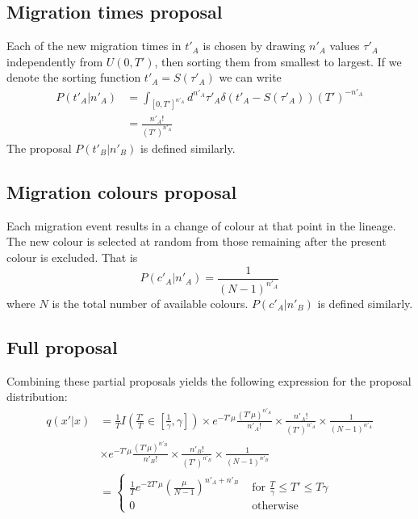 \documentclass[a4paper, 11pt]{article}
\begin{document}
\subsection{Migration times proposal}

Each of the new migration times in $t'_A$ is chosen by drawing $n'_A$
values $\tau'_A$ independently from $U(0,T')$, then sorting them from smallest
to largest.  If we denote the sorting function $t'_A=S(\tau'_A)$ we
can write
\begin{align}
  P(t'_A|n'_A) &= \int_{[0,T']^{n'_A}}
  d^{n'_A}\tau'_A\delta(t'_A-S(\tau'_A))(T')^{-n'_A}\nonumber\\
&= \frac{n'_A!}{(T')^{n'_A}}
\end{align}
The proposal $P(t'_B|n'_B)$ is defined similarly.

\subsection{Migration colours proposal}

Each migration event results in a change of colour at that point in
the lineage. The new colour is selected at random from those remaining
after the present colour is excluded. That is
\begin{equation}
  P(c'_A|n'_A) = \frac{1}{(N-1)^{n'_A}}
\end{equation}
where $N$ is the total number of available colours. $P(c'_A|n'_B)$ is
defined similarly.

\subsection{Full proposal}

Combining these partial proposals yields the following expression for
the proposal distribution:
\begin{align}
  q(x'|x)&=
  \frac{1}{T}I(\frac{T'}{T}\in[\frac{1}{\gamma},\gamma])\times
  e^{-T'\mu}\frac{(T'\mu)^{n'_A}}{n'_A!}\times
  \frac{n'_A!}{(T')^{n'_A}}\times \frac{1}{(N-1)^{n'_A}}\nonumber\\
&\times e^{-T'\mu}\frac{(T'\mu)^{n'_B}}{n'_B!}\times
  \frac{n'_B!}{(T')^{n'_B}}\times \frac{1}{(N-1)^{n'_B}}\nonumber\\
&=\left\{\begin{array}{rl}
\frac{1}{T}e^{-2T'\mu}\left(\frac{\mu}{N-1}\right)^{n'_A+n'_B} & \text{ for }
\frac{T}{\gamma}\leq T' \leq T\gamma\\
0 & \text{ otherwise}
\end{array}\right.
\end{align}
\end{document}
